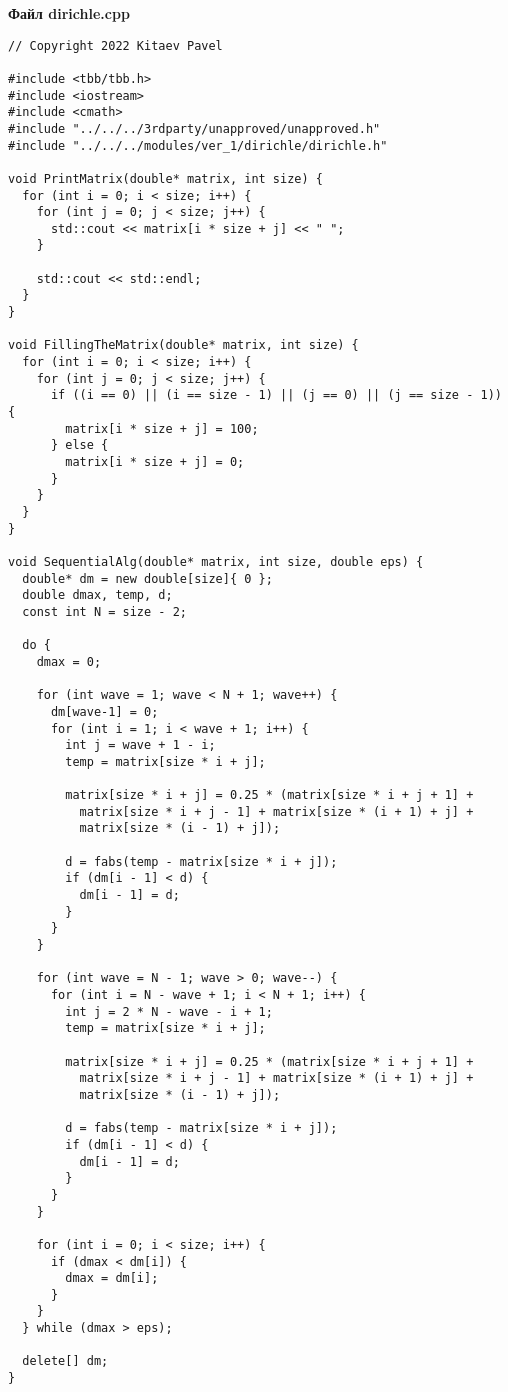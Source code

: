 \documentclass{report}
\begin{document}
\textbf{ Файл dirichle.cpp }
\begin{lstlisting}
// Copyright 2022 Kitaev Pavel

#include <tbb/tbb.h>
#include <iostream>
#include <cmath>
#include "../../../3rdparty/unapproved/unapproved.h"
#include "../../../modules/ver_1/dirichle/dirichle.h"

void PrintMatrix(double* matrix, int size) {
  for (int i = 0; i < size; i++) {
    for (int j = 0; j < size; j++) {
      std::cout << matrix[i * size + j] << " ";
    }

    std::cout << std::endl;
  }
}

void FillingTheMatrix(double* matrix, int size) {
  for (int i = 0; i < size; i++) {
    for (int j = 0; j < size; j++) {
      if ((i == 0) || (i == size - 1) || (j == 0) || (j == size - 1)) {
        matrix[i * size + j] = 100;
      } else {
        matrix[i * size + j] = 0;
      }
    }
  }
}

void SequentialAlg(double* matrix, int size, double eps) {
  double* dm = new double[size]{ 0 };
  double dmax, temp, d;
  const int N = size - 2;

  do {
    dmax = 0;

    for (int wave = 1; wave < N + 1; wave++) {
      dm[wave-1] = 0;
      for (int i = 1; i < wave + 1; i++) {
        int j = wave + 1 - i;
        temp = matrix[size * i + j];

        matrix[size * i + j] = 0.25 * (matrix[size * i + j + 1] +
          matrix[size * i + j - 1] + matrix[size * (i + 1) + j] +
          matrix[size * (i - 1) + j]);

        d = fabs(temp - matrix[size * i + j]);
        if (dm[i - 1] < d) {
          dm[i - 1] = d;
        }
      }
    }

    for (int wave = N - 1; wave > 0; wave--) {
      for (int i = N - wave + 1; i < N + 1; i++) {
        int j = 2 * N - wave - i + 1;
        temp = matrix[size * i + j];

        matrix[size * i + j] = 0.25 * (matrix[size * i + j + 1] +
          matrix[size * i + j - 1] + matrix[size * (i + 1) + j] +
          matrix[size * (i - 1) + j]);

        d = fabs(temp - matrix[size * i + j]);
        if (dm[i - 1] < d) {
          dm[i - 1] = d;
        }
      }
    }

    for (int i = 0; i < size; i++) {
      if (dmax < dm[i]) {
        dmax = dm[i];
      }
    }
  } while (dmax > eps);

  delete[] dm;
}


\end{lstlisting}
\end{document}
